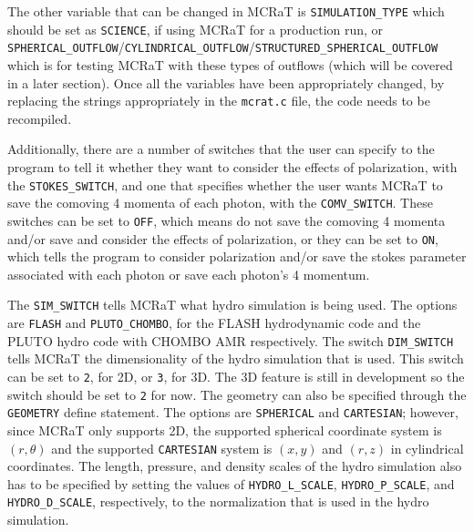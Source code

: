 \documentclass[12pt,a4paper]{article}
\begin{document}
The other variable that can be changed in MCRaT is \texttt{SIMULATION\_TYPE} which should be set as \texttt{SCIENCE}, if using MCRaT for a production run, or \texttt{SPHERICAL\_OUTFLOW}/\texttt{CYLINDRICAL\_OUTFLOW}/\texttt{STRUCTURED\_SPHERICAL\_OUTFLOW} which is for testing MCRaT with these types of outflows (which will be covered in a later section). Once all the variables have been appropriately changed, by replacing the strings appropriately in the \texttt{mcrat.c} file, the code needs to be recompiled.

Additionally, there are a number of switches that the user can specify to the program to tell it whether they want to consider the effects of polarization, with the \texttt{STOKES\_SWITCH}, and one that specifies whether the user wants MCRaT to save the comoving 4 momenta of each photon, with the \texttt{COMV\_SWITCH}. These switches can be set to \texttt{OFF}, which means do not save the comoving 4 momenta and/or save and consider the effects of polarization, or they can be set to \texttt{ON}, which tells the program to consider polarization and/or save the stokes parameter associated with each photon or save each photon's 4 momentum.

The \texttt{SIM\_SWITCH} tells MCRaT what hydro simulation is being used. The options are \texttt{FLASH} and \texttt{PLUTO\_CHOMBO}, for the FLASH hydrodynamic code and the PLUTO hydro code with CHOMBO AMR respectively. The switch \texttt{DIM\_SWITCH} tells MCRaT the dimensionality of the hydro simulation that is used. This switch can be set to \texttt{2}, for 2D, or \texttt{3}, for 3D. The 3D feature is still in development so the switch should be set to \texttt{2} for now. The geometry can also be specified through the \texttt{GEOMETRY} define statement. The options are \texttt{SPHERICAL} and \texttt{CARTESIAN}; however, since MCRaT only supports 2D, the supported spherical coordinate system is $(r, \theta)$ and the supported \texttt{CARTESIAN} system is $(x,y)$ and $(r,z)$ in cylindrical coordinates. The length, pressure, and density scales of the hydro simulation also has to be specified by setting the values of \texttt{HYDRO\_L\_SCALE}, \texttt{HYDRO\_P\_SCALE}, and \texttt{HYDRO\_D\_SCALE}, respectively, to the normalization that is used in the hydro simulation.
\end{document}
